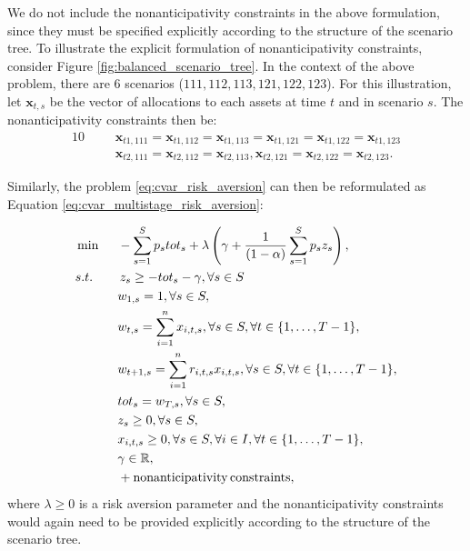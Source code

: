 \begin{rem}
We do not include the nonanticipativity constraints in the above formulation, since they must be specified explicitly according to the structure of the scenario tree. To illustrate the explicit formulation of nonanticipativity constraints, consider Figure \ref{fig:balanced_scenario_tree}. In the context of the above problem, there are 6 scenarios ($111, 112, 113, 121, 122, 123$). For this illustration, let $\mathbf{x}_{t,s}$ be the vector of allocations to each assets at time $t$ and in scenario $s$. The nonanticipativity constraints then be:
\begin{alignat}{10}
& && \mathbf{x}_{t1,111}=\mathbf{x}_{t1,112}=\mathbf{x}_{t1,113}=\mathbf{x}_{t1,121}=\mathbf{x}_{t1,122}=\mathbf{x}_{t1,123} \nonumber \\
& && \mathbf{x}_{t2,111}=\mathbf{x}_{t2,112}=\mathbf{x}_{t2,113},\mathbf{x}_{t2,121}=\mathbf{x}_{t2,122}=\mathbf{x}_{t2,123}. \nonumber
\end{alignat}
\end{rem}
Similarly, the problem \ref{eq:cvar_risk_aversion} can then be reformulated as Equation \ref{eq:cvar_multistage_risk_aversion}:

\begin{alignat}{10}
& \min  \, \, \, && - \sum_{s=1}^{S} p_s tot_s + \lambda \left( \gamma + \frac{1}{(1-\alpha)} \sum_{s=1}^S p_s z_s \right), \label{eq:cvar_multistage_risk_aversion}  \\
&s.t. && \, z_s \geq  -tot_s -\gamma, \forall s \in S \nonumber \\
& && w_{1,s}=1, \forall s \in S, \nonumber \\
& && w_{t,s}=\sum_{i=1}^{n} x_{i,t,s}, \forall s \in S, \forall t \in \{1,\dots ,T-1\}, \nonumber \\
& && w_{t+1,s}=\sum_{i=1}^{n} r_{i,t,s} x_{i,t,s}, \forall s \in S, \forall t \in \{1,\dots ,T-1\},  \nonumber \\
& && tot_s = w_{T,s}, \forall s \in S, \nonumber \\
& && z_s \geq 0, \forall s \in S, \nonumber \\
& && x_{i,t,s} \geq 0, \forall s \in S, \forall i \in I, \forall t \in \{1,\dots ,T-1\}, \nonumber \\
& && \gamma \in \R ,\nonumber \\
& && + \mathrm{nonanticipativity \, constraints}, \nonumber
\end{alignat}
where $\lambda \geq 0$ is a risk aversion parameter and the nonanticipativity constraints would again need to be provided explicitly according to the structure of the scenario tree.